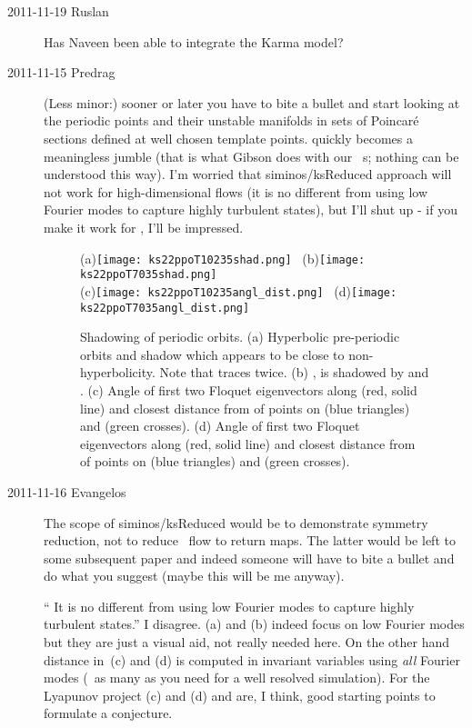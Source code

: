\begin{description}
\item[2011-11-19 Ruslan] Has Naveen been able to integrate the Karma model?

\item[2011-11-15 Predrag] (Less minor:) sooner or later you have to bite
a bullet and start looking at the periodic points and their unstable
manifolds in sets of Poincar\'e sections defined at well chosen template
points.  quickly becomes a meaningless jumble (that
is what Gibson does with our \pCf\ \po s; nothing can be
understood this way). I'm worried that siminos/ksReduced
approach will not work for high-dimensional flows (it is no different
from using low Fourier modes to capture highly turbulent states), but
I'll shut up - if you make it work for \KS, I'll be impressed.

\begin{figure}[ht]
  \begin{center}
    (a)\texttt{[image: ks22ppoT10235shad.png]}~
    (b)\texttt{[image: ks22ppoT7035shad.png]}\\
    (c)\texttt{[image: ks22ppoT10235angl\_dist.png]}~
    (d)\texttt{[image: ks22ppoT7035angl\_dist.png]}
  \end{center}
  \caption{Shadowing of periodic orbits. (a) Hyperbolic pre-periodic orbits
     and  shadow  which appears to be close
    to non-hyperbolicity. Note that  traces  twice.
    (b) , is shadowed by  and .
    (c) Angle of first two Floquet eigenvectors along  (red, solid line) and
    closest distance from  of points on  (blue triangles) and 
    (green crosses). (d) Angle of first two Floquet eigenvectors along  (red, solid line) and
    closest distance from  of points on  (blue triangles) and 
    (green crosses).
    }
  \label{fig:ks22shad}
\end{figure}


\item[2011-11-16 Evangelos] The scope of siminos/ksReduced would be to
demonstrate symmetry reduction, not to reduce \KS\ flow to return maps.
The latter would be left to some subsequent paper and indeed someone will have
to bite a bullet and do what you suggest (maybe this will be me anyway).

`` It is no different from using low Fourier modes to capture
highly turbulent states.'' I disagree. (a)
and (b) indeed focus on low Fourier modes but they are just a visual aid,
not really needed here. On the other hand distance in
\,(c) and (d) is computed in invariant variables using
\emph{all} Fourier modes (\ie\ as many as you need for a well resolved
simulation). For the Lyapunov project (c) and (d)
and  are, I think, good starting points to formulate
a conjecture.


\end{description}

